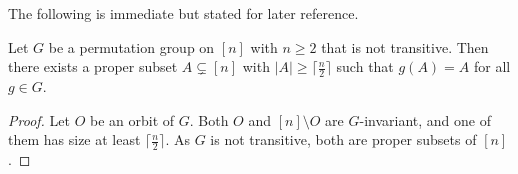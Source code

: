 The following is immediate but stated for later reference.

\begin{proposition} \label{syncmax:prop:intransitive-subset}
	Let $G$ be a permutation group on $[n]$ with $n \ge 2$ that is not transitive.
	Then there exists a proper subset $A \subsetneq [n]$ with $|A| \ge \lceil \tfrac{n}{2} \rceil$
	such that $g(A) = A$ for all $g \in G$.
\end{proposition}
\begin{proof}
	Let $O$ be an orbit of $G$. Both $O$ and $[n] \setminus O$ are $G$-invariant, and one of them
	has size at least $\lceil \tfrac{n}{2} \rceil$.
	As $G$ is not transitive, both are proper subsets of $[n]$.
\end{proof}








